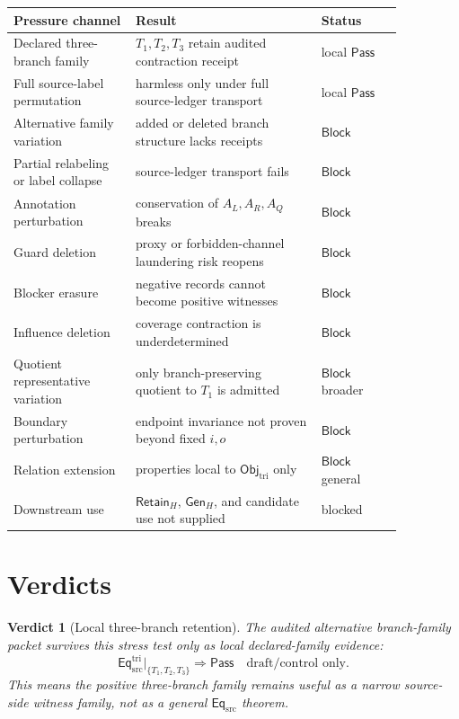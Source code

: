 \documentclass[11pt]{article}
\newcommand{\EqSrc}{\mathsf{Eq}_{\mathrm{src}}}
\newcommand{\EqTri}{\mathsf{Eq}_{\mathrm{src}}^{\mathrm{tri}}}
\newcommand{\ObjTri}{\mathsf{Obj}_{\mathrm{tri}}}
\newcommand{\RetainH}{\mathsf{Retain}_{H}}
\newcommand{\GenH}{\mathsf{Gen}_{H}}
\newcommand{\Pass}{\mathsf{Pass}}
\newcommand{\Block}{\mathsf{Block}}
\newtheorem{verdict}{Verdict}
\begin{document}
\begin{center}
\begin{tabular}{p{0.27\linewidth}p{0.41\linewidth}p{0.18\linewidth}}
\textbf{Pressure channel} & \textbf{Result} & \textbf{Status} \\
\hline
Declared three-branch family & \(T_{1},T_{2},T_{3}\) retain audited contraction receipt & local \(\Pass\) \\
Full source-label permutation & harmless only under full source-ledger transport & local \(\Pass\) \\
Alternative family variation & added or deleted branch structure lacks receipts & \(\Block\) \\
Partial relabeling or label collapse & source-ledger transport fails & \(\Block\) \\
Annotation perturbation & conservation of \(A_L,A_R,A_Q\) breaks & \(\Block\) \\
Guard deletion & proxy or forbidden-channel laundering risk reopens & \(\Block\) \\
Blocker erasure & negative records cannot become positive witnesses & \(\Block\) \\
Influence deletion & coverage contraction is underdetermined & \(\Block\) \\
Quotient representative variation & only branch-preserving quotient to \(T_1\) is admitted & \(\Block\) broader \\
Boundary perturbation & endpoint invariance not proven beyond fixed \(i,o\) & \(\Block\) \\
Relation extension & properties local to \(\ObjTri\) only & \(\Block\) general \\
Downstream use & \(\RetainH\), \(\GenH\), and candidate use not supplied & blocked \\
\end{tabular}
\end{center}

\section{Verdicts}

\begin{verdict}[Local three-branch retention]
The audited alternative branch-family packet survives this stress test
only as local declared-family evidence:
\[
    \EqTri\big|_{\{T_{1},T_{2},T_{3}\}} \Rightarrow \Pass
    \quad\text{draft/control only.}
\]
This means the positive three-branch family remains useful as a narrow
source-side witness family, not as a general \(\EqSrc\) theorem.
\end{verdict}
\end{document}

